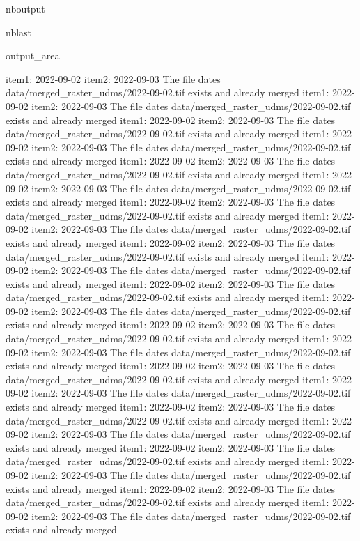 \documentclass[letterpaper,10pt]{sphinxmanual}
\begin{document}
\begin{sphinxuseclass}{nboutput}
\begin{sphinxuseclass}{nblast}
{\begin{sphinxuseclass}{output_area}
\begin{sphinxuseclass}{}
\begin{sphinxVerbatim}[commandchars=\\\{\}]
item1:  2022-09-02
item2:  2022-09-03
The file dates data/merged\_raster\_udms/2022-09-02.tif exists and already merged
item1:  2022-09-02
item2:  2022-09-03
The file dates data/merged\_raster\_udms/2022-09-02.tif exists and already merged
item1:  2022-09-02
item2:  2022-09-03
The file dates data/merged\_raster\_udms/2022-09-02.tif exists and already merged
item1:  2022-09-02
item2:  2022-09-03
The file dates data/merged\_raster\_udms/2022-09-02.tif exists and already merged
item1:  2022-09-02
item2:  2022-09-03
The file dates data/merged\_raster\_udms/2022-09-02.tif exists and already merged
item1:  2022-09-02
item2:  2022-09-03
The file dates data/merged\_raster\_udms/2022-09-02.tif exists and already merged
item1:  2022-09-02
item2:  2022-09-03
The file dates data/merged\_raster\_udms/2022-09-02.tif exists and already merged
item1:  2022-09-02
item2:  2022-09-03
The file dates data/merged\_raster\_udms/2022-09-02.tif exists and already merged
item1:  2022-09-02
item2:  2022-09-03
The file dates data/merged\_raster\_udms/2022-09-02.tif exists and already merged
item1:  2022-09-02
item2:  2022-09-03
The file dates data/merged\_raster\_udms/2022-09-02.tif exists and already merged
item1:  2022-09-02
item2:  2022-09-03
The file dates data/merged\_raster\_udms/2022-09-02.tif exists and already merged
item1:  2022-09-02
item2:  2022-09-03
The file dates data/merged\_raster\_udms/2022-09-02.tif exists and already merged
item1:  2022-09-02
item2:  2022-09-03
The file dates data/merged\_raster\_udms/2022-09-02.tif exists and already merged
item1:  2022-09-02
item2:  2022-09-03
The file dates data/merged\_raster\_udms/2022-09-02.tif exists and already merged
item1:  2022-09-02
item2:  2022-09-03
The file dates data/merged\_raster\_udms/2022-09-02.tif exists and already merged
item1:  2022-09-02
item2:  2022-09-03
The file dates data/merged\_raster\_udms/2022-09-02.tif exists and already merged
item1:  2022-09-02
item2:  2022-09-03
The file dates data/merged\_raster\_udms/2022-09-02.tif exists and already merged
item1:  2022-09-02
item2:  2022-09-03
The file dates data/merged\_raster\_udms/2022-09-02.tif exists and already merged
item1:  2022-09-02
item2:  2022-09-03
The file dates data/merged\_raster\_udms/2022-09-02.tif exists and already merged
item1:  2022-09-02
item2:  2022-09-03
The file dates data/merged\_raster\_udms/2022-09-02.tif exists and already merged
item1:  2022-09-02
item2:  2022-09-03
The file dates data/merged\_raster\_udms/2022-09-02.tif exists and already merged
item1:  2022-09-02
item2:  2022-09-03
The file dates data/merged\_raster\_udms/2022-09-02.tif exists and already merged

\end{sphinxVerbatim}
\end{sphinxuseclass}
\end{sphinxuseclass}}
\end{sphinxuseclass}
\end{sphinxuseclass}
\end{document}
